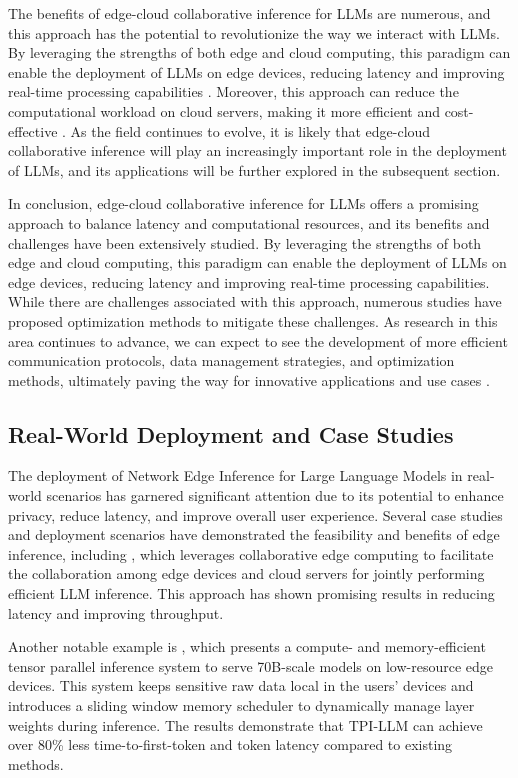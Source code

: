 \documentclass[11pt,a4paper]{article}
\begin{document}
The benefits of edge-cloud collaborative inference for LLMs are numerous, and this approach has the potential to revolutionize the way we interact with LLMs. By leveraging the strengths of both edge and cloud computing, this paradigm can enable the deployment of LLMs on edge devices, reducing latency and improving real-time processing capabilities \cite{arxiv:2403.03853}. Moreover, this approach can reduce the computational workload on cloud servers, making it more efficient and cost-effective \cite{arxiv:2401.15024}. As the field continues to evolve, it is likely that edge-cloud collaborative inference will play an increasingly important role in the deployment of LLMs, and its applications will be further explored in the subsequent section.

In conclusion, edge-cloud collaborative inference for LLMs offers a promising approach to balance latency and computational resources, and its benefits and challenges have been extensively studied. By leveraging the strengths of both edge and cloud computing, this paradigm can enable the deployment of LLMs on edge devices, reducing latency and improving real-time processing capabilities. While there are challenges associated with this approach, numerous studies have proposed optimization methods to mitigate these challenges. As research in this area continues to advance, we can expect to see the development of more efficient communication protocols, data management strategies, and optimization methods, ultimately paving the way for innovative applications and use cases \cite{arxiv:2407.00928} \cite{arxiv:2506.07533}.


\subsection{Real-World Deployment and Case Studies}


The deployment of Network Edge Inference for Large Language Models in real-world scenarios has garnered significant attention due to its potential to enhance privacy, reduce latency, and improve overall user experience. Several case studies and deployment scenarios have demonstrated the feasibility and benefits of edge inference, including \cite{arxiv:2405.14371}, which leverages collaborative edge computing to facilitate the collaboration among edge devices and cloud servers for jointly performing efficient LLM inference. This approach has shown promising results in reducing latency and improving throughput.

Another notable example is \cite{arxiv:2410.00531}, which presents a compute- and memory-efficient tensor parallel inference system to serve 70B-scale models on low-resource edge devices. This system keeps sensitive raw data local in the users' devices and introduces a sliding window memory scheduler to dynamically manage layer weights during inference. The results demonstrate that TPI-LLM can achieve over 80\% less time-to-first-token and token latency compared to existing methods.
\end{document}
